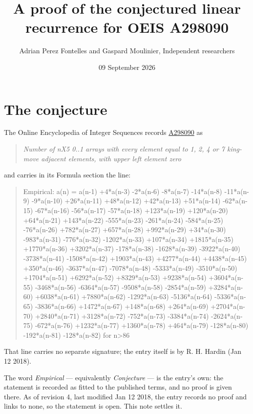 \documentclass[11pt]{article}
\title{A proof of the conjectured linear recurrence for OEIS A298090}
\author{Adrian Perez Fontelles and Gaspard Moulinier, Independent researchers}
\date{09 September 2026}
\theoremstyle{definition}
\begin{document}
\maketitle
\section{The conjecture}

The Online Encyclopedia of Integer Sequences records \href{https://oeis.org/A298090}{A298090} as

\begin{quote}\itshape Number of nX5 0..1 arrays with every element equal to 1, 2, 4 or 7 king-move adjacent elements, with upper left element zero\end{quote}

and carries in its Formula section the line:

\begin{quote}\ttfamily Empirical: a(n) = a(n-1) +4*a(n-3) -2*a(n-6) -8*a(n-7) -14*a(n-8) -11*a(n-9) -9*a(n-10) +26*a(n-11) +48*a(n-12) +42*a(n-13) +51*a(n-14) -62*a(n-15) -67*a(n-16) -56*a(n-17) -57*a(n-18) +123*a(n-19) +120*a(n-20) +64*a(n-21) +143*a(n-22) -555*a(n-23) -261*a(n-24) -584*a(n-25) -76*a(n-26) +782*a(n-27) +657*a(n-28) +992*a(n-29) +34*a(n-30) -983*a(n-31) -776*a(n-32) -1202*a(n-33) +107*a(n-34) +1815*a(n-35) +1770*a(n-36) +3202*a(n-37) -178*a(n-38) -1628*a(n-39) -3922*a(n-40) -3738*a(n-41) -1508*a(n-42) +1903*a(n-43) +4277*a(n-44) +4438*a(n-45) +350*a(n-46) -3637*a(n-47) -7078*a(n-48) -5333*a(n-49) -3510*a(n-50) +1704*a(n-51) +6292*a(n-52) +8329*a(n-53) +9238*a(n-54) +3604*a(n-55) -3468*a(n-56) -6364*a(n-57) -9508*a(n-58) -2854*a(n-59) +3284*a(n-60) +6038*a(n-61) +7880*a(n-62) -1292*a(n-63) -5136*a(n-64) -5336*a(n-65) -3836*a(n-66) +1472*a(n-67) +148*a(n-68) +264*a(n-69) +2704*a(n-70) +2840*a(n-71) +3128*a(n-72) -752*a(n-73) -3384*a(n-74) -2624*a(n-75) -672*a(n-76) +1232*a(n-77) +1360*a(n-78) +464*a(n-79) -128*a(n-80) -192*a(n-81) -128*a(n-82) for n>86\end{quote}

That line carries no separate signature; the entry itself is by R. H. Hardin (Jan 12 2018).

The word {\itshape Empirical} --- equivalently {\itshape Conjecture} --- is the entry's own: the statement is recorded as fitted to the published terms, and no proof is given there. As of revision 4, last modified Jan 12 2018, the entry records no proof and links to none, so the statement is open. This note settles it.
\end{document}
